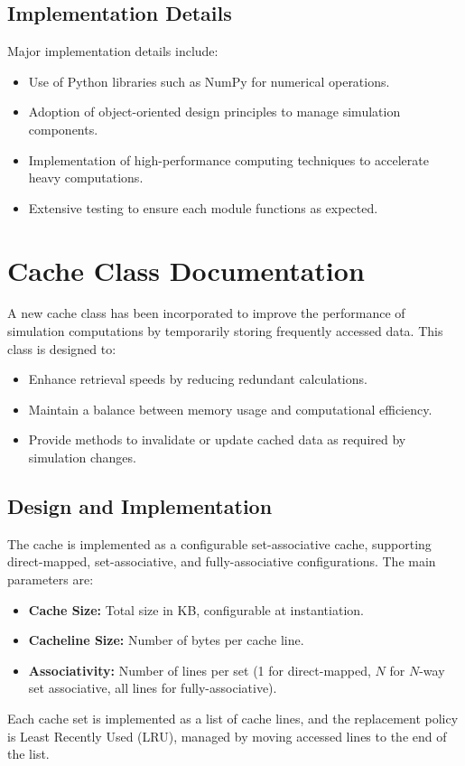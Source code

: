 \documentclass[12pt,a4paper]{report}
\begin{document}
\subsection{Implementation Details}
Major implementation details include:
\begin{itemize}
  \item Use of Python libraries such as NumPy for numerical operations.
  \item Adoption of object-oriented design principles to manage simulation components.
  \item Implementation of high-performance computing techniques to accelerate heavy computations.
  \item Extensive testing to ensure each module functions as expected.
\end{itemize}

\section{Cache Class Documentation}
A new cache class has been incorporated to improve the performance of simulation computations by temporarily storing frequently accessed data. This class is designed to:
\begin{itemize}
  \item Enhance retrieval speeds by reducing redundant calculations.
  \item Maintain a balance between memory usage and computational efficiency.
  \item Provide methods to invalidate or update cached data as required by simulation changes.
\end{itemize}

\subsection{Design and Implementation}
The cache is implemented as a configurable set-associative cache, supporting direct-mapped, set-associative, and fully-associative configurations. The main parameters are:
\begin{itemize}
  \item \textbf{Cache Size:} Total size in KB, configurable at instantiation.
  \item \textbf{Cacheline Size:} Number of bytes per cache line.
  \item \textbf{Associativity:} Number of lines per set (1 for direct-mapped, $N$ for $N$-way set associative, all lines for fully-associative).
\end{itemize}
Each cache set is implemented as a list of cache lines, and the replacement policy is Least Recently Used (LRU), managed by moving accessed lines to the end of the list.
\end{document}
